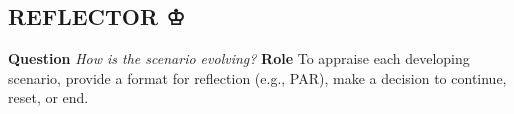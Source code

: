 \subsection*{REFLECTOR {\chess ♔}{\hfill \sensory}}

\textbf{Question} \emph{How is the scenario evolving?}\newline
\textbf{Role} To appraise each developing scenario, provide a format
for reflection (e.g., PAR), make a decision to continue, reset, or end.
